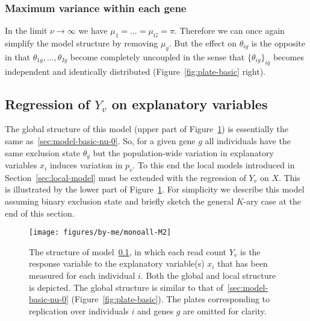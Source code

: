 \documentclass[letterpaper]{article}
\begin{document}
\subsubsection{Maximum variance within each gene}
\label{sec:model-basic-nu-infinit}

In the limit \(\nu\rightarrow\infty\) we have \(\mu_1=...=\mu_G=\pi\).
Therefore we can once again simplify the model structure by removing
\(\mu_g\).  But the effect on \(\theta_{ig}\) is the opposite in that
\(\theta_{1g},...,\theta_{Ig}\) become completely uncoupled in the sense that
\(\{\theta_{ig}\}_{ig}\) becomes independent and identically distributed
(Figure~\ref{fig:plate-basic} right).

\subsection{Regression of \(Y_v\) on explanatory variables }
\label{sec:model-Y-regr}

The global structure of this model (upper part of Figure~\ref{fig:plate-Y-regr}) is essentially the same as~\ref{sec:model-basic-nu-0}.
So, for a given gene \(g\) all individuals have the same exclusion state
\(\theta_g\) but the population-wide variation in explanatory variables
\(x_i\) induces variation in \(p_v\).  To this end the local models introduced
in Section~\ref{sec:local-model} must be extended with the regression of
\(Y_v\) on \(X\).  This is illustrated by the lower part of
Figure~\ref{fig:plate-Y-regr}.  For simplicity we describe this model assuming binary
exclusion state and briefly sketch the general \(K\)-ary case at the end of
this section.

\begin{figure}[t]
\begin{center}
\texttt{[image: figures/by-me/monoall-M2]}
\end{center}
\caption{
The structure of model~\ref{sec:model-Y-regr}, in which each read
count \(Y_v\) is the response variable to the explanatory variable(s) \(x_i\)
that has been measured for each individual \(i\).  Both the global and local
structure is depicted.  The global structure is similar
to that of~\ref{sec:model-basic-nu-0} (Figure~\ref{fig:plate-basic}).  The plates
corresponding to replication over individuals \(i\) and genes \(g\) are omitted
for clarity.
}
\label{fig:plate-Y-regr}
\end{figure}
\end{document}
